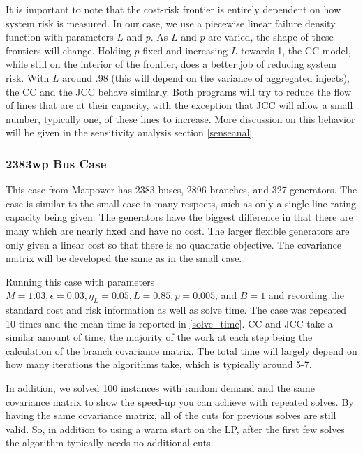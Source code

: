It is important to note that the cost-risk frontier is entirely dependent on how system risk is measured.  In our case, we use a piecewise linear failure density function with parameters $L$ and $p$.  As $L$ and $p$ are varied, the shape of these frontiers will change.  Holding $p$ fixed and increasing $L$ towards 1, the CC model, while still on the interior of the frontier, does a better job of reducing system risk.  With $L$ around .98 (this will depend on the variance of aggregated injects), the CC and the JCC behave similarly.  Both programs will try to reduce the flow of lines that are at their capacity, with the exception that JCC will allow a small number, typically one, of these lines to increase.  More discussion on this behavior will be given in the sensitivity analysis section \ref{senseanal}


\subsubsection*{2383wp Bus Case}
This case from Matpower has 2383 buses, 2896 branches, and 327 generators.  The case is similar to the small case in many respects, such as only a single line rating capacity being given.  The generators have the biggest difference in that there are many which are nearly fixed and have no cost.  The larger flexible generators are only given a linear cost so that there is no quadratic objective.  The covariance matrix will be developed the same as in the small case.

Running this case with parameters $M=1.03, \epsilon=0.03, \eta_L=0.05, L=0.85, p=0.005$, and $B=1$ and recording the standard cost and risk information as well as solve time.  The case was repeated 10 times and the mean time is reported in \ref{solve_time}.  CC and JCC take a similar amount of time, the majority of the work at each step being the calculation of the branch covariance matrix.  The total time will largely depend on how many iterations the algorithms take, which is typically around 5-7. 

In addition, we solved 100 instances with random demand and the same covariance matrix to show the speed-up you can achieve with repeated solves.  By having the same covariance matrix, all of the cuts for previous solves are still valid.  So, in addition to using a warm start on the LP, after the first few solves the algorithm typically needs no additional cuts.

